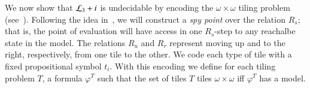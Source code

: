 \begin{pf}
\begin{center}
\end{center}

\end{pf}


We now show that $\mathcal{L}_3 + i$ is undecidable by encoding the
$\omega\times\omega$ tiling problem (see~\cite{BGG97}). Following
the idea in~\cite{BS95}, we will construct a \emph{spy point} over the relation
$R_s$; that is, the point of evaluation will have access in one $R_s$-step
to any reachalbe state in the model. The relations $R_u$ and $R_r$
represent moving up and to the right, respectively, from one tile to
the other. We code each type of tile with a fixed propositional
symbol $t_i$. With this encoding we define for each tiling problem
$T$, a formula $\varphi^T$ such that the set of tiles $T$ tiles
$\omega\times\omega$ iff $\varphi^T$ has a model.


